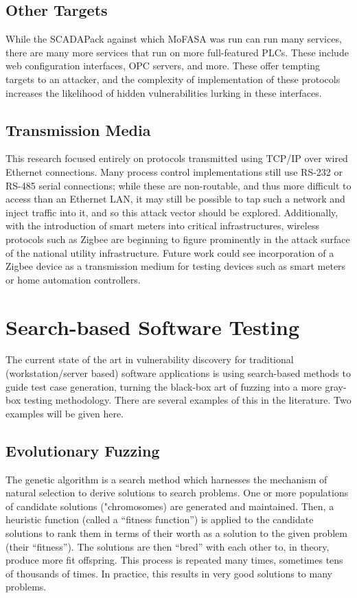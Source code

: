 \documentclass{report}
\begin{document}
\subsection{Other Targets}
While the SCADAPack against which MoFASA was run can run many services, there are many more services that run on more full-featured PLCs.
These include web configuration interfaces, OPC servers, and more. These offer tempting targets to an attacker, and the complexity
of implementation of these protocols increases the likelihood of hidden vulnerabilities lurking in these interfaces.
\subsection{Transmission Media}
This research focused entirely on protocols transmitted using TCP/IP over wired Ethernet connections. Many process control implementations still
use RS-232 or RS-485 serial connections; while these are non-routable, and thus more difficult to access than an Ethernet LAN, it may still be possible
to tap such a network and inject traffic into it, and so this attack vector should be explored. Additionally, with the introduction of smart meters into
critical infrastructures, wireless protocols such as Zigbee are beginning to figure prominently in the attack surface of the national utility infrastructure.
Future work could see incorporation of a Zigbee device as a transmission medium for testing devices such as smart meters or home automation controllers.

\section{Search-based Software Testing}
The current state of the art in vulnerability discovery for traditional (workstation/server based) software applications is using search-based methods to
guide test case generation, turning the black-box art of fuzzing into a more gray-box testing methodology. There are several examples of this in the literature.
Two examples will be given here.
\subsection{Evolutionary Fuzzing}
The genetic algorithm is a search method which harnesses the mechanism of natural selection to derive solutions to search problems. One or more populations of
candidate solutions ("chromosomes) are generated and maintained. Then, a heuristic function (called a ``fitness function'') is applied to the candidate solutions to rank them
in terms of their worth as a solution to the given problem (their ``fitness''). The solutions are then ``bred'' with each other to, in theory, produce more
fit offspring. This process is repeated many times, sometimes tens of thousands of times. In practice, this results in very good solutions to many problems.
\end{document}
